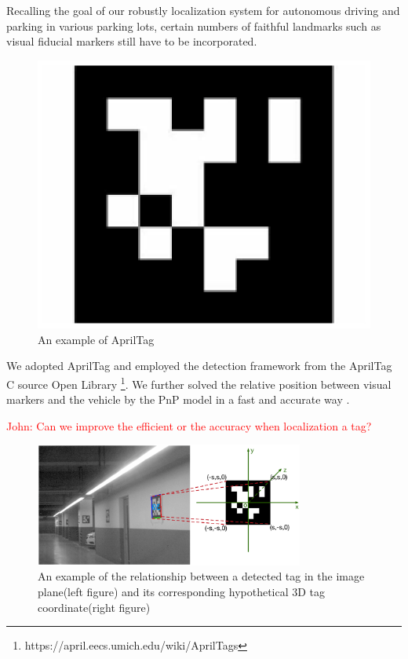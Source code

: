 \documentclass[journal]{IEEEtran}
\newcommand{\COMMENT}[1]{\textcolor{red}{#1}}
\begin{document}
Recalling the goal of our robustly localization system for autonomous driving and parking in various parking lots, certain numbers of faithful landmarks such as visual fiducial markers still have to be incorporated.

\begin{figure}
\centering
\includegraphics{pic/fig6_Visual_markers}
\caption{An example of AprilTag}\label{fig:6}
\end{figure}

We adopted AprilTag and employed the detection framework from the AprilTag C source Open Library \footnote{https://april.eecs.umich.edu/wiki/AprilTags}\cite{Olson2011AprilTag}.
We further solved the relative position between visual markers and the vehicle by the PnP model in a fast and accurate way \cite{Hartley2003Multiple}. 

\COMMENT{John: Can we improve the efficient or the accuracy when localization a tag?}

\begin{figure}
\centering
\includegraphics[height = 1.6in]{pic/fig7_Visual_markers}
\caption{
An example of the relationship between a detected tag in the image plane(left figure) and its corresponding hypothetical 3D tag coordinate(right figure)
}\label{fig:7}
\end{figure}
\end{document}
